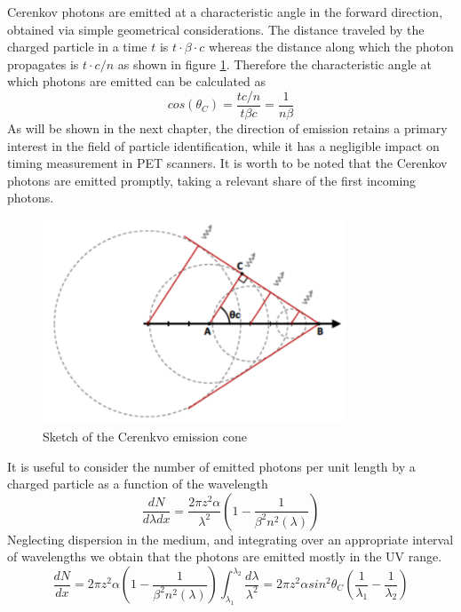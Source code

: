 Cerenkov photons are emitted at a characteristic angle in the forward direction, obtained via simple geometrical considerations. The distance traveled by the charged particle in a time $t$ is $t\cdot \beta \cdot c$ whereas the distance along which the photon propagates is $t\cdot c /n$ as shown in figure \ref{fig:cone}.
Therefore the characteristic angle at which photons are emitted can be calculated as
\begin{equation}
cos(\theta _{C}) = \frac{t c/n}{t \beta c} = \frac{1}{n\beta}
\end{equation}
As will be shown in the next chapter, the direction of emission retains a primary interest in the field of particle identification, while it has a negligible impact on timing measurement in PET scanners. It is worth to be noted that the Cerenkov photons are emitted promptly, taking a relevant share of the first incoming photons.  
\begin{figure}
\centering
\includegraphics[width=9cm]{../Pictures/Chapter_2/cone.pdf}
\caption[Cerenkov emission cone]{Sketch of the Cerenkvo emission cone}
\label{fig:cone}
\end{figure}
It is useful to consider the number of emitted photons per unit length by a charged particle as a function of the wavelength
\begin{equation}
\frac{dN}{d\lambda dx} = \frac{2\pi z^{2}\alpha}{\lambda ^{2}}\left( 1 - \frac{1}{\beta ^{2}n^{2}(\lambda)} \right)
\end{equation}
Neglecting dispersion in the medium, and integrating over an appropriate interval of wavelengths we obtain that the photons are emitted mostly in the UV range.
\begin{equation}
\frac{dN}{dx} = 2\pi z^{2} \alpha \left( 1-\frac{1}{\beta ^{2} n^{2} (\lambda)}\right) \int _{\lambda _{1}} ^{\lambda _{2}} \frac{d\lambda}{\lambda ^{2}}  = 2\pi z^{2}\alpha sin^{2}\theta _{C} \left( \frac{1}{\lambda _{1}}-\frac{1}{\lambda _{2}}\right)
\label{eq:number}
\end{equation}

